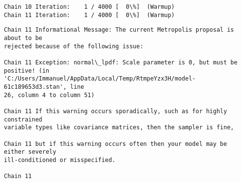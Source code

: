 \documentclass[11pt]{article}
\begin{document}
    \begin{Verbatim}[commandchars=\\\{\}]
Chain 10 Iteration:    1 / 4000 [  0\%]  (Warmup)
Chain 11 Iteration:    1 / 4000 [  0\%]  (Warmup)
    \end{Verbatim}

    \begin{Verbatim}[commandchars=\\\{\}]
Chain 11 Informational Message: The current Metropolis proposal is about to be
rejected because of the following issue:

Chain 11 Exception: normal\_lpdf: Scale parameter is 0, but must be positive! (in
'C:/Users/Immanuel/AppData/Local/Temp/RtmpeYzx3H/model-61c189653d3.stan', line
26, column 4 to column 51)

Chain 11 If this warning occurs sporadically, such as for highly constrained
variable types like covariance matrices, then the sampler is fine,

Chain 11 but if this warning occurs often then your model may be either severely
ill-conditioned or misspecified.

Chain 11

    \end{Verbatim}
\end{document}
